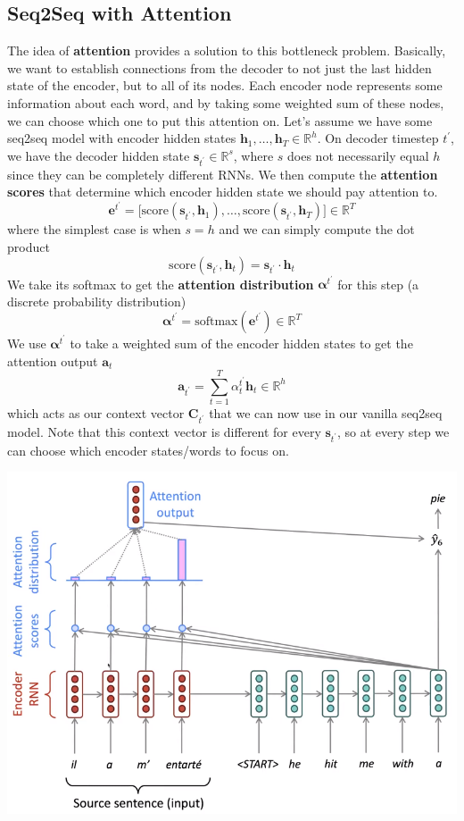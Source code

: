 \documentclass{article}
\begin{document}
  \subsection{Seq2Seq with Attention}

    The idea of \textbf{attention} provides a solution to this bottleneck problem. Basically, we want to establish connections from the decoder to not just the last hidden state of the encoder, but to all of its nodes. Each encoder node represents some information about each word, and by taking some weighted sum of these nodes, we can choose which one to put this attention on. Let's assume we have some seq2seq model with encoder hidden states $\mathbf{h}_1, \ldots, \mathbf{h}_T \in \mathbb{R}^h$. On decoder timestep $t^\prime$, we have the decoder hidden state $\mathbf{s}_{t^\prime} \in \mathbb{R}^s$, where $s$ does not necessarily equal $h$ since they can be completely different RNNs. We then compute the \textbf{attention scores} that determine which encoder hidden state we should pay attention to. 
    \[\mathbf{e}^{t^\prime} = \big[ \mathrm{score}(\mathbf{s}_{t^\prime}, \mathbf{h}_1 ), \ldots, \mathrm{score}(\mathbf{s}_{t^\prime}, \mathbf{h}_T) \big] \in \mathbb{R}^T\]
    where the simplest case is when $s = h$ and we can simply compute the dot product 
    \[\mathrm{score} (\mathbf{s}_{t^\prime}, \mathbf{h}_t) = \mathbf{s}_{t^\prime} \cdot \mathbf{h}_t\]
    We take its softmax to get the \textbf{attention distribution} $\boldsymbol{\alpha}^{t^\prime}$ for this step (a discrete probability distribution) 
    \[\boldsymbol{\alpha}^{t^\prime} = \mathrm{softmax} (\mathbf{e}^{t^\prime}) \in \mathbb{R}^T\]
    We use $\boldsymbol{\alpha}^{t^\prime}$ to take a weighted sum of the encoder hidden states to get the attention output $\mathbf{a}_t$ 
    \[\mathbf{a}_{t^\prime} = \sum_{t=1}^T \alpha_{t}^{t^\prime} \mathbf{h}_t \in \mathbb{R}^h\]
    which acts as our context vector $\mathbf{C}_{t^\prime}$ that we can now use in our vanilla seq2seq model. Note that this context vector is different for every $\mathbf{s}_{t^\prime}$, so at every step we can choose which encoder states/words to focus on.  
    \begin{center}
        \includegraphics[scale=0.3]{img/10_Attention/seq2seq_attention.png}
    \end{center}
\end{document}
